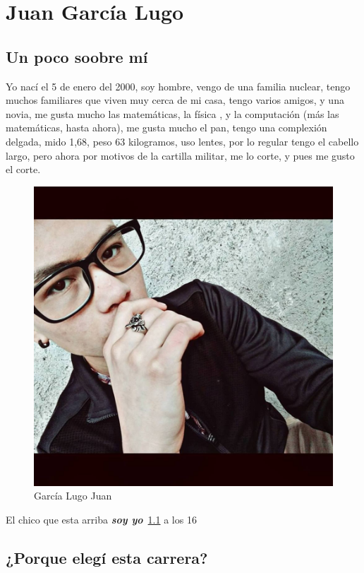

\chapter{Juan García Lugo}

\section{Un poco soobre mí}

Yo nací el 5 de enero del 2000, soy hombre, vengo de una familia nuclear, tengo muchos familiares que viven muy cerca de mi casa, tengo varios amigos, y una novia, me gusta mucho las matemáticas, la física , y la computación (más las matemáticas, hasta ahora), me gusta mucho el pan, tengo una complexión delgada, mido 1,68, peso 63 kilogramos, uso lentes, por lo regular tengo el cabello largo, pero ahora por motivos de la cartilla militar, me lo corte, y pues me gusto el corte.

\begin{figure}[h]
  \centering
  \includegraphics[scale=0.125]{IMG/18.jpg}
  \caption{García Lugo Juan}
  \label{foto:juan}
\end{figure}

El chico que esta arriba \emph{\textbf{soy yo}}~\ref{foto:juan} a los 16   
\section{¿Porque elegí esta carrera?}

